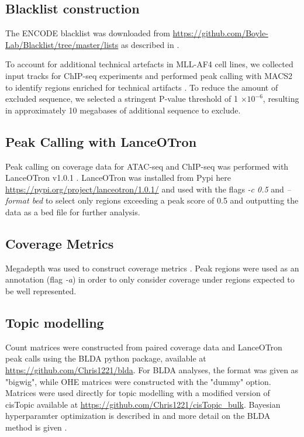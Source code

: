 \subsection{Blacklist construction}

The ENCODE blacklist was downloaded from \url{https://github.com/Boyle-Lab/Blacklist/tree/master/lists} as described in \textcite{Amemiya2019}.

To account for additional technical artefacts in MLL-AF4 cell lines, we collected input tracks for ChIP-seq experiments and performed peak calling with MACS2 to identify regions enriched for technical artifacts \cite{Gaspar2018}. To reduce the amount of excluded sequence, we selected a stringent P-value threshold of 1 $\times 10^{-6}$, resulting in approximately 10 megabases of additional sequence to exclude. 

\subsection{Peak Calling with LanceOTron}

Peak calling on coverage data for ATAC-seq and ChIP-seq was performed with LanceOTron v1.0.1 \cite{Hentges2021}. LanceOTron was installed from Pypi here \url{https://pypi.org/project/lanceotron/1.0.1/} and used with the flags \textit{-c 0.5} and \textit{--format bed} to select only regions exceeding a peak score of 0.5 and outputting the data as a bed file for further analysis. 


\subsection{Coverage Metrics}

Megadepth was used to construct coverage metrics \cite{Wilks2021}. Peak regions were used as an annotation (flag \textit{-a}) in order to only consider coverage under regions expected to be well represented.

\subsection{Topic modelling}

Count matrices were constructed from paired coverage data and LanceOTron peak calls using the BLDA python package, available at \url{https://github.com/Chris1221/blda}. For BLDA analyses, the format was given as "bigwig", while OHE matrices were constructed with the "dummy" option. Matrices were used directly for topic modelling with a modified version of cisTopic available at \url{https://github.com/Chris1221/cisTopic_bulk}. Bayesian hyperparamter optimization is described in  and more detail on the BLDA method is given .


